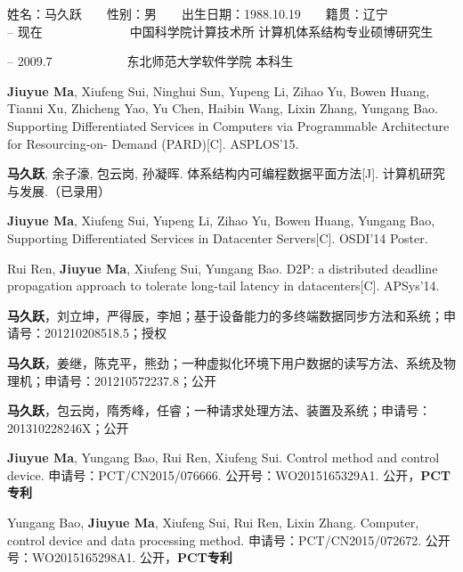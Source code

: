\begin{resume}

\noindent
姓名：马久跃　　性别：男　　出生日期：1988.10.19　　籍贯：辽宁\\

 -- 现在　　　　　　　中国科学院计算技术所 计算机体系结构专业硕博研究生

 -- 2009.7　　　　　　东北师范大学软件学院 本科生\\

  \begin{enumerate}[leftmargin=1.5\parindent, nolistsep, label={[\arabic*]}]
    \item \textbf{Jiuyue Ma}, Xiufeng Sui, Ninghui Sun, Yupeng Li, Zihao Yu, Bowen Huang, Tianni Xu, Zhicheng Yao, Yu Chen, Haibin Wang, Lixin Zhang, Yungang Bao.
          Supporting Differentiated Services in Computers via Programmable Architecture for Resourcing-on- Demand (PARD)[C]. ASPLOS'15.
    \item \textbf{马久跃}, 余子濠, 包云岗, 孙凝晖. 体系结构内可编程数据平面方法[J]. 计算机研究与发展.（已录用）
    \item \textbf{Jiuyue Ma}, Xiufeng Sui, Yupeng Li, Zihao Yu, Bowen Huang, Yungang Bao, Supporting Differentiated Services in Datacenter Servers[C]. OSDI'14 Poster.
    \item Rui Ren, \textbf{Jiuyue Ma}, Xiufeng Sui, Yungang Bao. D2P: a distributed deadline propagation approach to tolerate long-tail latency in datacenters[C]. APSys'14.
  \end{enumerate}

  \begin{enumerate}[leftmargin=1.5\parindent, nolistsep, label={[\arabic*]}]
    \item \textbf{马久跃}，刘立坤，严得辰，李旭；基于设备能力的多终端数据同步方法和系统；申请号：201210208518.5；授权
    \item \textbf{马久跃}，姜继，陈克平，熊劲；一种虚拟化环境下用户数据的读写方法、系统及物理机；申请号：201210572237.8；公开
    \item \textbf{马久跃}，包云岗，隋秀峰，任睿；一种请求处理方法、装置及系统；申请号：201310228246X；公开
    \item  \textbf{Jiuyue Ma}, Yungang Bao, Rui Ren, Xiufeng Sui. Control method and control device. 申请号：PCT/CN2015/076666. 公开号：WO2015165329A1. 公开，\textbf{PCT专利}
    \item  Yungang Bao, \textbf{Jiuyue Ma}, Xiufeng Sui, Rui Ren, Lixin Zhang. Computer, control device and data processing method. 申请号：PCT/CN2015/072672. 公开号：WO2015165298A1. 公开，\textbf{PCT专利}
  \end{enumerate}


\end{resume}
